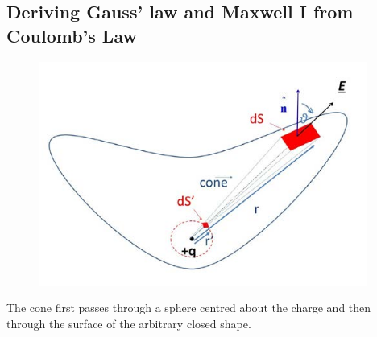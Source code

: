\documentclass[a4paper, 11pt, normalem]{report}
\begin{document}
\subsection{Deriving Gauss' law and Maxwell \RN{1} from Coulomb's Law}
\begin{figure}
    \begin{center}
        \includegraphics[scale=0.4]{fluxvec.png}
    \end{center}
\end{figure}
The cone first passes through a sphere centred about the charge and then through the surface of the arbitrary closed shape.
\end{document}
